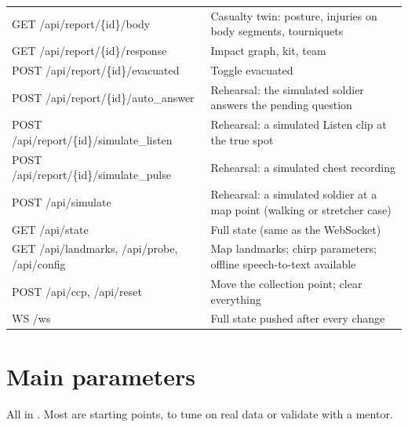 \begin{longtable}{>{\ttfamily\raggedright}p{6.2cm}p{8.6cm}}
GET /api/report/\{id\}/body & Casualty twin: posture, injuries on body segments, tourniquets\\
GET /api/report/\{id\}/response & Impact graph, kit, team\\
POST /api/report/\{id\}/evacuated & Toggle evacuated\\
POST /api/report/\{id\}/auto\_answer & Rehearsal: the simulated soldier answers the pending question\\
POST /api/report/\{id\}/simulate\_listen & Rehearsal: a simulated Listen clip at the true spot\\
POST /api/report/\{id\}/simulate\_pulse & Rehearsal: a simulated chest recording\\
POST /api/simulate & Rehearsal: a simulated soldier at a map point (walking or stretcher case)\\
GET /api/state & Full state (same as the WebSocket)\\
GET /api/landmarks, /api/probe, /api/config & Map landmarks; chirp parameters; offline speech-to-text available\\
POST /api/ccp, /api/reset & Move the collection point; clear everything\\
WS /ws & Full state pushed after every change\\
\bottomrule
\end{longtable}

\chapter{Main parameters}\label{app:params}

All in . Most are starting points, to tune on real data or validate with a mentor.


